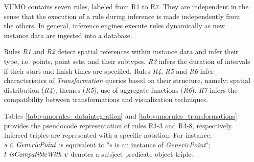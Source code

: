\documentclass[]{interact}
\theoremstyle{plain}%
\theoremstyle{definition}
\theoremstyle{remark}
\theoremstyle{definition}
\begin{document}

VUMO contains seven rules, labeled from R1 to R7. They are independent in the sense that the execution of a rule during inference is made independently from the others. In general, inference engines execute rules dynamically as new instance data are ingested into a database.

Rules \textit{R1} and \textit{R2} detect spatial references within instance data and infer their type, i.e. points, point sets, and their subtypes. \textit{R3} infers the duration of intervals if their start and finish times are specified. Rules \textit{R4}, \textit{R5} and \textit{R6} infer characteristics of \textit{Transformation} queries based on their structure, namely: spatial distribution (\textit{R4}), themes (\textit{R5}), use of aggregate functions (\textit{R6}). \textit{R7} infers the compatibility between transformations and visualization techniques.


Tables \ref{tab:vumorules_dataintegration} and \ref{tab:vumorules_transformations} provides the pseudocode representation of rules R1-3 and R4-8, respectively. Inferred triples are represented with a specific notation. For instance, $s \in \mbox{\textit{GenericPoint}}$ is equivalent to "$s$ is an instance of \textit{GenericPoint}"; $t \mbox{\textit{ isCompatibleWith }} v$ denotes a subject-predicate-object triple.

\end{document}
